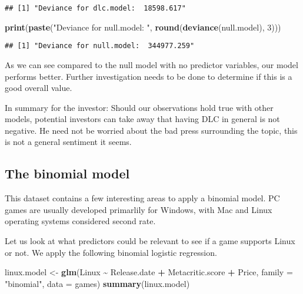\documentclass[
]{article}
\newenvironment{Shaded}{\begin{snugshade}}{\end{snugshade}}
\newcommand{\AttributeTok}[1]{\textcolor[rgb]{0.13,0.29,0.53}{#1}}
\newcommand{\DecValTok}[1]{\textcolor[rgb]{0.00,0.00,0.81}{#1}}
\newcommand{\FunctionTok}[1]{\textcolor[rgb]{0.13,0.29,0.53}{\textbf{#1}}}
\newcommand{\NormalTok}[1]{#1}
\newcommand{\OtherTok}[1]{\textcolor[rgb]{0.56,0.35,0.01}{#1}}
\newcommand{\SpecialCharTok}[1]{\textcolor[rgb]{0.81,0.36,0.00}{\textbf{#1}}}
\newcommand{\StringTok}[1]{\textcolor[rgb]{0.31,0.60,0.02}{#1}}
\begin{document}
\begin{verbatim}
## [1] "Deviance for dlc.model:  18598.617"
\end{verbatim}

\begin{Shaded}
\begin{Highlighting}[]
\FunctionTok{print}\NormalTok{(}\FunctionTok{paste}\NormalTok{(}\StringTok{"Deviance for null.model: "}\NormalTok{, }\FunctionTok{round}\NormalTok{(}\FunctionTok{deviance}\NormalTok{(null.model), }\DecValTok{3}\NormalTok{)))}
\end{Highlighting}
\end{Shaded}

\begin{verbatim}
## [1] "Deviance for null.model:  344977.259"
\end{verbatim}

As we can see compared to the null model with no predictor variables,
our model performs better. Further investigation needs to be done to
determine if this is a good overall value.

In summary for the investor: Should our observations hold true with
other models, potential investors can take away that having DLC in
general is not negative. He need not be worried about the bad press
surrounding the topic, this is not a general sentiment it seems.

\hypertarget{the-binomial-model}{%
\subsection{The binomial model}\label{the-binomial-model}}

This dataset contains a few interesting areas to apply a binomial model.
PC games are usually developed primarlily for Windows, with Mac and
Linux operating systems considered second rate.

Let us look at what predictors could be relevant to see if a game
supports Linux or not. We apply the following binomial logistic
regression.

\begin{Shaded}
\begin{Highlighting}[]
\NormalTok{linux.model }\OtherTok{\textless{}{-}} \FunctionTok{glm}\NormalTok{(Linux }\SpecialCharTok{\textasciitilde{}}\NormalTok{ Release.date }\SpecialCharTok{+}\NormalTok{ Metacritic.score }\SpecialCharTok{+}\NormalTok{ Price, }\AttributeTok{family =} \StringTok{"binomial"}\NormalTok{, }\AttributeTok{data =}\NormalTok{ games)}
\FunctionTok{summary}\NormalTok{(linux.model)}
\end{Highlighting}
\end{Shaded}
\end{document}
